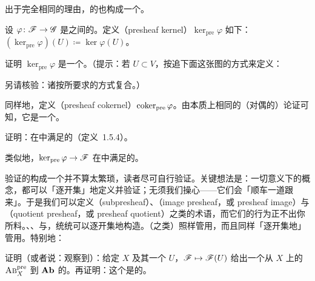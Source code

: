 出于完全相同的理由，\trAbelianGroups{}的\trSheaf{}也构成一个\trAdditiveCategory。

设 $\varphi\colon\mathscr{F}\to\mathscr{G}$ 是\trPresheaf{}之间的\trMorphism。定义\textbf{\trPresheaf\trKernel}（presheaf kernel）$\ker_{\mathrm{pre}}\varphi$ 如下：$(\ker_{\mathrm{pre}}\varphi)(U)\coloneqq\ker\varphi(U)$。

\begin{exercise}\label{ex:presheaf-kernel-is-presheaf}
证明 $\ker_{\mathrm{pre}}\varphi$ 是一个\trPresheaf{}。（提示：若 $U\subset V$，按追下面这张图的方式来定义\trRestrictionMap{}：
另请核验：诸\trRestrictionMap{}按所要求的方式复合。）
\end{exercise}

同样地，定义\textbf{\trPresheaf\trCokernel}（presheaf cokernel）$\operatorname{coker}_{\mathrm{pre}}\varphi$。由本质上相同的（对偶的）论证可知，它是一个\trPresheaf{}。

\begin{exercise}[余核名副其实]\label{ex:cokernel-deserves-name}
证明：\trPresheaf\trCokernel{}在\trPresheaf\trCategory{}中满足\trCokernel{}的\trUniversalProperty{}（定义~1.5.4）。
\end{exercise}

类似地，$\ker_{\mathrm{pre}}\varphi\to\mathscr{F}$ 在\trPresheaf\trCategory{}中满足\trKernel{}的\trUniversalProperty。

验证\trAbelianGroups{}的\trPresheaf{}构成一个\trAbelianCategory{}并不算太繁琐，读者尽可自行验证。关键想法是：一切\trAbelianCategory{}意义下的概念，都可以「逐开集」地定义并验证；\trRestrictionMap{}无须我们操心——它们会「顺车一道跟来」。于是我们可以定义\textbf{\trSubpresheaf}（subpresheaf）、\textbf{\trImage\trPresheaf}（image presheaf，或 presheaf image）与\textbf{\trQuotient\trPresheaf}（quotient presheaf，或 presheaf quotient）之类的术语，而它们的行为正不出你所料。\trKernel、\trQuotient、\trCokernel{}与\trImage，统统可以逐开集地构造。\trHomologicalAlgebra{}（\trExactSequence{}之类）照样管用，而且同样「逐开集地」管用。特别地：

\begin{exercise}[容易的练习]\label{ex:evaluation-functor-exact}
证明（或者说：观察到）：给定\trTopologicalSpace{} $X$ 及其一个\trOpenSet{} $U$，$\mathscr{F}\mapsto\mathscr{F}(U)$ 给出一个从 $X$ 上\trAbelianGroups{}的\trPresheaf\trCategory{} $\textsc{Ab}^{\mathrm{pre}}_{X}$ 到\trAbelianGroups\trCategory{} $\mathbf{Ab}$ 的\trFunctor。再证明：这个\trFunctor{}是\trExact{}的。
\end{exercise}

